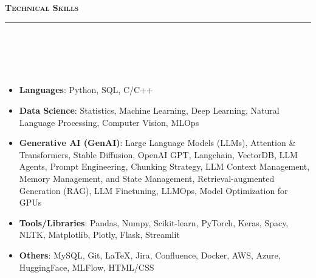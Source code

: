\documentclass[a4paper,10pt]{article}
\newcommand{\lsep}{-0.5cm}
\newcommand{\resheading}[1]{{\small
        {
            \begin{minipage}
                {0.992\textwidth}\textbf{{\textsc{#1 \vphantom{p\^{E}} }}}
                \\[-0.3cm]
                \hrule
            \end{minipage}
            \\[-0.5cm]
        }
 }}
\begin{document}
\vspace{4pt}
\noindent
\resheading{\textbf{\large Technical Skills}}\\[\lsep] 
\\[-0.2cm]
\begin{itemize}
  \item \textbf{Languages}: Python, SQL, C/C++\\[-0.5cm]
  \item \textbf{Data Science}: Statistics, Machine Learning, Deep Learning, Natural Language Processing, Computer Vision, MLOps  \\[-0.55cm]
  \item \textbf{Generative AI (GenAI)}: Large Language Models (LLMs), Attention \& Transformers, Stable Diffusion, OpenAI GPT, Langchain, VectorDB, LLM Agents, Prompt Engineering, Chunking Strategy, LLM Context Management, \\Memory Management, and State Management, Retrieval-augmented Generation (RAG), LLM Finetuning, LLMOps, Model Optimization for GPUs \\[-0.55cm]
  \item \textbf{Tools/Libraries}: Pandas, Numpy, Scikit-learn, PyTorch, Keras, Spacy, NLTK, Matplotlib, Plotly, Flask, Streamlit \\[-0.55cm]
  \item \textbf{Others}: MySQL, Git, LaTeX, Jira, Confluence, Docker, AWS, Azure, HuggingFace, MLFlow, HTML/CSS
\end{itemize}

\end{document}
